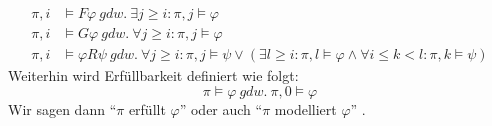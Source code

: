 \begin{equation*}
\begin{split}
    \pi, i &\models F\varphi\ gdw.\ \exists j \geq i: \pi, j \models \varphi\\
    \pi, i &\models G\varphi \ gdw.\ \forall j \geq i: \pi, j \models \varphi\\
    \pi, i &\models \varphi R\psi\ gdw.\ \forall j \geq i: \pi, j \models \psi \lor (\exists l \geq i: \pi, l \models \varphi \land \forall i \leq k < l: \pi, k \models \psi)
\end{split}
\end{equation*}
Weiterhin wird Erfüllbarkeit definiert wie folgt: 
\[
    \pi \models \varphi\ gdw.\ \pi, 0 \models \varphi
\]
Wir sagen dann "`$\pi$ erfüllt $\varphi$"' oder auch "`$\pi$ modelliert $\varphi$"' \cite{vardi+96}.

